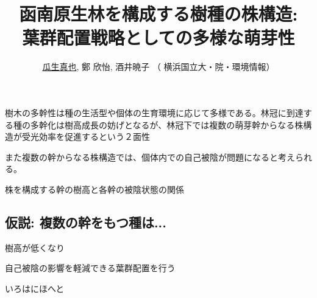 \documentclass[a0, 36pt, plainboxedsections]{sciposter} %
\title{函南原生林を構成する樹種の株構造:\\葉群配置戦略としての多様な萌芽性}
\author{\faUser \hspace{0.02em} \underline{瓜生真也}, 鄭 欣怡, 酒井暁子 （\faUniv \hspace{0.02em} 横浜国立大・院・環境情報） \normalsize{\faEnvelope \hspace{0.02em} \textit{\fontspec{ComicSansMS}{suika1127@gmail.com}}}}
\begin{document}
\maketitle
\begin{multicols}{2}

\begin{mdframed}[style=section.frame]
  \centering\huge{}
\end{mdframed}

樹木の多幹性は種の生活型や個体の生育環境に応じて多様である。林冠に到達する種の多幹化は樹高成長の妨げとなるが、林冠下では複数の萌芽幹からなる株構造が受光効率を促進するという２面性

また複数の幹からなる株構造では、個体内での自己被陰が問題になると考えられる。

株を構成する幹の樹高と各幹の被陰状態の関係

\subsection*{仮説: 複数の幹をもつ種は...}

\begin{list}{}{\setlength{\itemindent}{1em}} %
 \item 樹高が低くなり
 \item 自己被陰の影響を軽減できる葉群配置を行う
\end{list}

\begin{mdframed}[style=conclusion.frame]
  \centering\huge{}
  
  \flushleft\normalsize{いろはにほへと}
\end{mdframed}

\end{multicols}

\begin{mdframed}[style=section.frame]
  \centering\huge{}
\end{mdframed}
\end{document}
